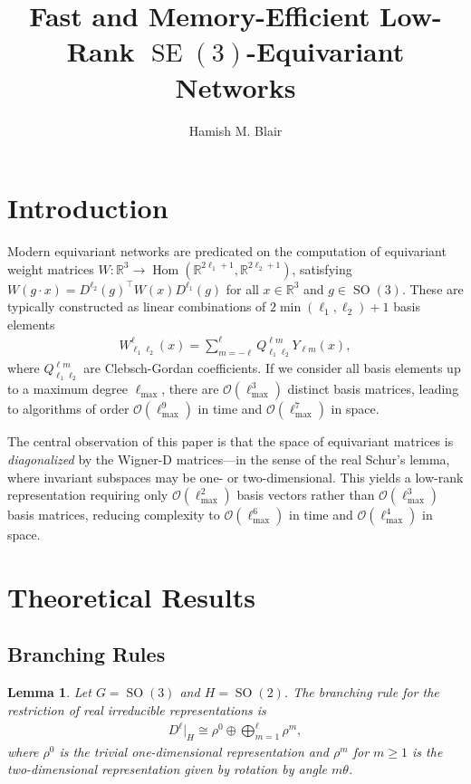 \documentclass[a4paper, 12pt]{article}
\title{Fast and Memory-Efficient Low-Rank $\operatorname{SE}(3)$-Equivariant Networks}
\author{Hamish M. Blair}
\newcommand{\Hom}{\operatorname{Hom}}
\newcommand{\SO}{\operatorname{SO}(3)}
\newcommand{\lmax}{\ell_{\text{max}}}
\newtheorem{lemma}[theorem]{Lemma}
\theoremstyle{definition}
\begin{document}
\maketitle

\section{Introduction}

Modern equivariant networks are predicated on the computation of equivariant weight matrices $W : \mathbb{R}^3 \to \Hom(\mathbb{R}^{2 \ell_1 + 1}, \mathbb{R}^{2 \ell_2 + 1})$, satisfying $W(g \cdot x) = D^{\ell_2}(g)^{\top} W(x) D^{\ell_1}(g)$ for all $x \in \mathbb{R}^3$ and $g \in \SO$. These are typically constructed as linear combinations of $2 \min(\ell_1, \ell_2) + 1$ basis elements
\begin{align*}
	W_{\ell_1 \ell_2}^{\ell}(x) = \sum_{m = - \ell}^{\ell} Q_{\ell_1 \ell_2}^{\ell m} Y_{\ell m}(x),
\end{align*}
where $Q_{\ell_1 \ell_2}^{\ell m}$ are Clebsch-Gordan coefficients. If we consider all basis elements up to a maximum degree $\lmax$, there are $\mathcal{O}(\lmax^3)$ distinct basis matrices, leading to algorithms of order $\mathcal{O}(\lmax^9)$ in time and $\mathcal{O}(\lmax^7)$ in space.

The central observation of this paper is that the space of equivariant matrices is \emph{diagonalized} by the Wigner-D matrices---in the sense of the real Schur's lemma, where invariant subspaces may be one- or two-dimensional. This yields a low-rank representation requiring only $\mathcal{O}(\lmax^2)$ basis vectors rather than $\mathcal{O}(\lmax^3)$ basis matrices, reducing complexity to $\mathcal{O}(\lmax^6)$ in time and $\mathcal{O}(\lmax^4)$ in space.


\section{Theoretical Results}

\subsection{Branching Rules}

\begin{lemma}\label{lem:branching}
Let $G = \SO$ and $H = \operatorname{SO}(2)$. The branching rule for the restriction of real irreducible representations is
\begin{align*}
	D^{\ell}|_{H} \cong \rho^0 \oplus \bigoplus_{m = 1}^{\ell} \rho^m,
\end{align*}
where $\rho^0$ is the trivial one-dimensional representation and $\rho^m$ for $m \geq 1$ is the two-dimensional representation given by rotation by angle $m\theta$.
\end{lemma}
\end{document}
